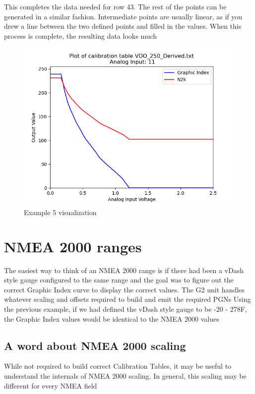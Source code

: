 \documentclass[12pt, letterpaper, twoside, titlepage]{article}
\begin{document}
This completes the data needed for row 43.  The rest of the points can be generated in a similar fashion.  Intermediate points are usually linear, as if you drew a line between the two defined points and filled in the values.  When this process is complete, the resulting data looks much


\begin{figure}[hbt!]
  \includegraphics[width=\linewidth]{VDO_250_Derived.txt.png}
  \centering
  \caption{Example 5 visualization}
  \label{fig:Example_5}
\end{figure}

\section{NMEA 2000 ranges}
The easiest way to think of an NMEA 2000 range is if there had been a vDash style gauge configured to the same range and the goal was to figure out the correct Graphic Index curve to display the correct values.  The G2 unit handles whatever scaling and offsets required to build and emit the required PGNs  Using the previous example, if we had defined the vDash style gauge to be -20 - 278F, the Graphic Index values would be identical to the NMEA 2000 values

\subsection{A word about NMEA 2000 scaling}
While not required to build correct Calibration Tables, it may be useful to understand the internals of NMEA 2000 scaling.  In general, this scaling may be different for every NMEA field
\end{document}
